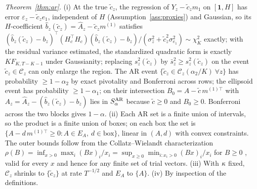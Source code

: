 \documentclass[12pt]{article}
\theoremstyle{plain}\newtheorem{theorem}{Theorem}[section]\newtheorem{proposition}[theorem]{Proposition}\newtheorem{lemma}[theorem]{Lemma}\newtheorem{corollary}[theorem]{Corollary}
\theoremstyle{definition}\newtheorem{definition}[theorem]{Definition}\newtheorem{assumption}[theorem]{Assumption}\newtheorem{remark}[theorem]{Remark}
\begin{document}
\textit{Theorem~\ref{thm:ar}.} (i) At the true $\tilde c_z$, the regression of $Y_z-\tilde c_zm_1$ on $[\mathbf 1,H]$ has error $\varepsilon_z-\tilde c_ze_1$, independent of $H$ (Assumption~\ref{ass:proxies}) and Gaussian, so its $H$-coefficient $\hat b_z(\tilde c_z)=\hat A_z-\tilde c_zm^{(1)}$ satisfies $(\hat b_z(\tilde c_z)-b_z)^{\top}(H_c^\top H_c)(\hat b_z(\tilde c_z)-b_z)/(\sigma_z^2+\tilde c_z^2\sigma_{e_1}^2)\sim\chi^2_K$ exactly; with the residual variance estimated, the standardized quadratic form is exactly $K F_{K,T-K-1}$ under Gaussianity; replacing $s_z^2(\tilde c_z)$ by $\bar s_z^2\ge s_z^2(\tilde c_z)$ on the event $\tilde c_z\in\mathcal C_z$ can only enlarge the region. The AR event $\{\tilde c_z\in\mathcal C_z(\alpha_2/K)\ \forall z\}$ has probability $\ge1-\alpha_2$ by exact pivotality and Bonferroni across rows; the ellipsoid event has probability $\ge1-\alpha_1$; on their intersection $B_0=A-\tilde c\,m^{(1)\top}$ with $A_z=\hat A_z-(\hat b_z(\tilde c_z)-b_z)$ lies in $S^{\rm AR}_\alpha$ because $\tilde c\ge0$ and $B_0\ge0$. Bonferroni across the two blocks gives $1-\alpha$. (ii) Each AR set is a finite union of intervals, so the product is a finite union of boxes; on each box the set is $\{A-d\,m^{(1)\top}\ge0:A\in E_A,\ d\in\text{box}\}$, linear in $(A,d)$ with convex constraints. The outer bounds follow from the Collatz--Wielandt characterization $\rho(B)=\inf_{x>0}\max_i(Bx)_i/x_i=\sup_{x\ge0}\min_{i:x_i>0}(Bx)_i/x_i$ for $B\ge0$ \citep{hornjohnson2013}, valid for every $x$ and hence for any finite set of trial vectors. (iii) With $\kappa$ fixed, $\mathcal C_z$ shrinks to $\{\tilde c_z\}$ at rate $T^{-1/2}$ and $E_A$ to $\{A\}$. (iv) By inspection of the definitions.



\end{document}
